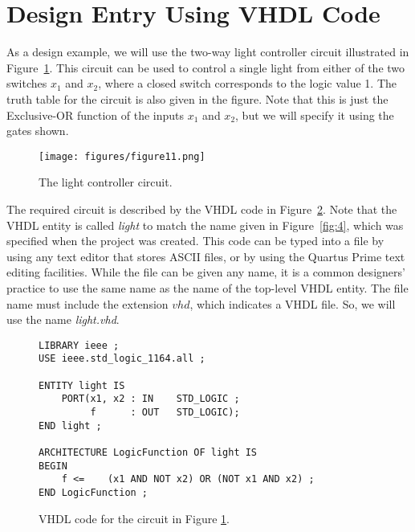 \section{Design Entry Using VHDL Code}


\noindent
As a design example, we will use the two-way light controller circuit illustrated in 
Figure~\ref{fig:11}. This circuit can be used to control a single light from either of the
two switches $x_1$ and $x_2$, where a closed switch corresponds to the logic value 1.
The truth table for the circuit is also given in the figure. Note that
this is just the Exclusive-OR function of the inputs $x_1$ and $x_2$,
but we will specify it using the gates shown.

\begin{figure}[H]
   \begin{center}
      \texttt{[image: figures/figure11.png]}
   \caption{The light controller circuit.} 
	 \label{fig:11}
	 \end{center}
\end{figure}

The required circuit is described by the VHDL code in Figure~\ref{fig:12}.
Note that the VHDL entity is called {\it light} to match the name given in 
Figure~\ref{fig:4}, which was specified when the project was created.
This code can be typed into a file by using any text editor
that stores ASCII files, or by using the Quartus Prime text editing facilities.
While the file can be given any name, it is a common designers' practice to
use the same name as the name of the top-level VHDL entity.
The file name must include the extension $vhd$, which indicates a VHDL
file. So, we will use the name {\it light.vhd}.

\lstset{language=VHDL} 
\begin{figure}[H]
\begin{center}
\begin{minipage}[h]{12.5 cm}
\begin{lstlisting}
LIBRARY ieee ;
USE ieee.std_logic_1164.all ;

ENTITY light IS
	PORT(x1, x2	: IN	STD_LOGIC ;
		 f		: OUT	STD_LOGIC);
END light ;

ARCHITECTURE LogicFunction OF light IS
BEGIN
	f <=	(x1 AND NOT x2) OR (NOT x1 AND x2) ;
END LogicFunction ;
\end{lstlisting}
\end{minipage}
\end{center}
	\caption{VHDL code for the circuit in Figure \ref{fig:11}.}

	\label{fig:12}
\end{figure}


